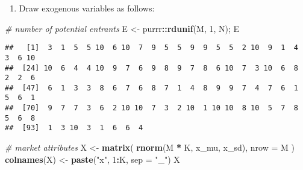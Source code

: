 \documentclass[
]{book}
\newenvironment{Shaded}{\begin{snugshade}}{\end{snugshade}}
\newcommand{\CommentTok}[1]{\textcolor[rgb]{0.56,0.35,0.01}{\textit{#1}}}
\newcommand{\DataTypeTok}[1]{\textcolor[rgb]{0.13,0.29,0.53}{#1}}
\newcommand{\DecValTok}[1]{\textcolor[rgb]{0.00,0.00,0.81}{#1}}
\newcommand{\KeywordTok}[1]{\textcolor[rgb]{0.13,0.29,0.53}{\textbf{#1}}}
\newcommand{\NormalTok}[1]{#1}
\newcommand{\OperatorTok}[1]{\textcolor[rgb]{0.81,0.36,0.00}{\textbf{#1}}}
\newcommand{\StringTok}[1]{\textcolor[rgb]{0.31,0.60,0.02}{#1}}
\providecommand{\tightlist}{%
  \setlength{\itemsep}{0pt}\setlength{\parskip}{0pt}}
\begin{document}
\begin{enumerate}
\def\labelenumi{\arabic{enumi}.}
\setcounter{enumi}{2}
\tightlist
\item
  Draw exogenous variables as follows:
\end{enumerate}

\begin{Shaded}
\begin{Highlighting}[]
\CommentTok{# number of potential entrants}
\NormalTok{E <-}\StringTok{ }\NormalTok{purrr}\OperatorTok{::}\KeywordTok{rdunif}\NormalTok{(M, }\DecValTok{1}\NormalTok{, N); E}
\end{Highlighting}
\end{Shaded}

\begin{verbatim}
##   [1]  3  1  5  5 10  6 10  7  9  5  5  9  9  5  5  2 10  9  1  4  3  6 10
##  [24] 10  6  4  4 10  9  7  6  9  8  9  7  8  6 10  7  3 10  6  8  2  2  6
##  [47]  6  1  3  3  8  6  7  6  8  7  1  4  8  9  9  7  4  7  6  1  5  6  1
##  [70]  9  7  7  3  6  2 10 10  7  3  2 10  1 10 10  8 10  5  7  8  5  6  8
##  [93]  1  3 10  3  1  6  6  4
\end{verbatim}

\begin{Shaded}
\begin{Highlighting}[]
\CommentTok{# market attributes}
\NormalTok{X <-}\StringTok{ }\KeywordTok{matrix}\NormalTok{(}
  \KeywordTok{rnorm}\NormalTok{(M }\OperatorTok{*}\StringTok{ }\NormalTok{K, x_mu, x_sd),}
  \DataTypeTok{nrow =}\NormalTok{ M}
\NormalTok{)}
\KeywordTok{colnames}\NormalTok{(X) <-}\StringTok{ }\KeywordTok{paste}\NormalTok{(}\StringTok{"x"}\NormalTok{, }\DecValTok{1}\OperatorTok{:}\NormalTok{K, }\DataTypeTok{sep =} \StringTok{"_"}\NormalTok{)}
\NormalTok{X}
\end{Highlighting}
\end{Shaded}
\end{document}
